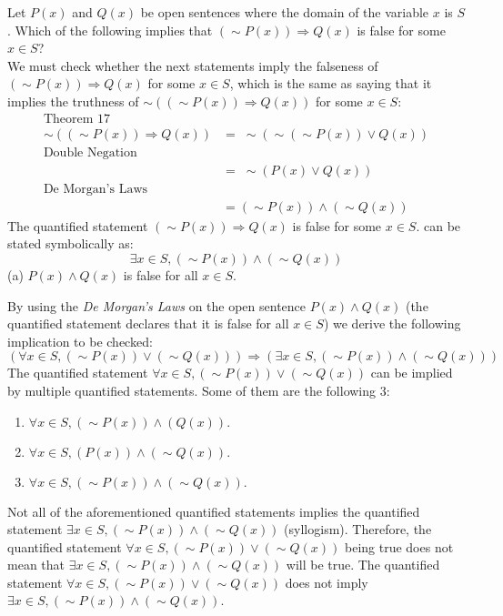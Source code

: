 \documentclass[12pt]{article}
\newenvironment{problem}[2][Problem]{\begin{trivlist}
		\item[\hskip \labelsep {\bfseries #1}\hskip \labelsep {\bfseries #2.}]}{\end{trivlist}}
\newenvironment{solution}[2][Solution]{\begin{trivlist}
		\item[\hskip \labelsep {\bfseries #1}\hskip \labelsep {\bfseries #2.}]}{\end{trivlist}}
\begin{document}
\begin{problem}{72}
	Let $P(x)$ and $Q(x)$ be open sentences where the domain of the variable $x$ is $S$. Which of the following implies that $(\sim P(x))\Rightarrow Q(x)$ is false for some $x \in S$?\\
	We must check whether the next statements imply the falseness of $(\sim P(x)) \Rightarrow Q(x)$ for some $x \in S$, which is the same as saying that it implies the truthness of $\sim((\sim P(x)) \Rightarrow Q(x))$ for some $x \in S$:
	\begin{align*}
		\text{Theorem 17}\\
		\sim((\sim P(x)) \Rightarrow Q(x)) &= \; \sim(\sim(\sim P(x))\vee  Q(x))\\
		\text{Double Negation}\\
		&= \; \sim(P(x)\vee  Q(x))\\
		\text{De Morgan's Laws}\\
		& = (\sim P(x)) \wedge (\sim Q(x))
	\end{align*}
The quantified statement $(\sim P(x))\Rightarrow Q(x)$ is false for some $x \in S$. can be stated symbolically as:
\begin{equation*}
	\exists x\in S, (\sim P(x))\wedge (\sim Q(x))
\end{equation*}
(a) $P(x)\wedge Q(x)$ is false for all $x\in S$.
\begin{solution}{a}
	By using the \textit{De Morgan's Laws} on the open sentence $P(x)\wedge Q(x)$ (the quantified statement declares that it is false for all $x \in S$) we derive the following implication to be checked:
	\begin{equation*}
			(\forall x \in S, (\sim P(x)) \vee (\sim Q(x))) \Rightarrow (\exists x\in S, (\sim P(x))\wedge (\sim Q(x)))
	\end{equation*}
	The quantified statement $\forall x \in S, (\sim P(x))\vee (\sim Q(x))$ can be implied by multiple quantified statements. Some of them are the following 3:
	\begin{enumerate}
		\item $\forall x \in S, (\sim P(x))\wedge (Q(x)).$
		\item $\forall x \in S, (P(x))\wedge (\sim Q(x)).$
		\item $\forall x \in S, (\sim P(x))\wedge (\sim Q(x)).$
	\end{enumerate}
Not all of the aforementioned quantified statements implies the quantified statement $\exists x\in S, (\sim P(x))\wedge (\sim Q(x))$ (syllogism). Therefore, the quantified statement $\forall x \in S, (\sim P(x)) \vee (\sim Q(x))$ being true does not mean that $\exists x\in S, (\sim P(x))\wedge (\sim Q(x))$ will be true. The quantified statement $\forall x \in S, (\sim P(x)) \vee (\sim Q(x))$ does not imply $\exists x\in S, (\sim P(x))\wedge (\sim Q(x))$.
\end{solution}


\end{problem}
\end{document}
